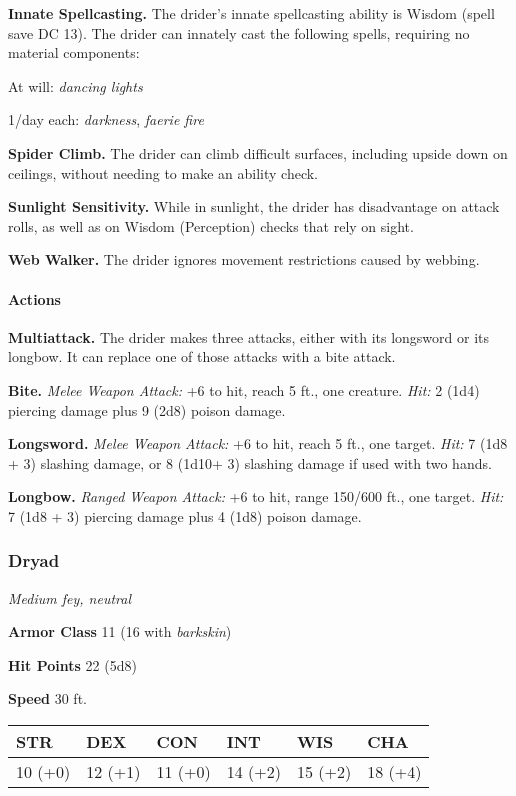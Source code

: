 \documentclass[
]{article}
\begin{document}
\textbf{Innate Spellcasting.} The drider's innate spellcasting ability
is Wisdom (spell save DC 13). The drider can innately cast the following
spells, requiring no material components:

At will: \emph{dancing lights}

1/day each: \emph{darkness}, \emph{faerie fire}

\textbf{Spider Climb.} The drider can climb difficult surfaces,
including upside down on ceilings, without needing to make an ability
check.

\textbf{Sunlight Sensitivity.} While in sunlight, the drider has
disadvantage on attack rolls, as well as on Wisdom (Perception) checks
that rely on sight.

\textbf{Web Walker.} The drider ignores movement restrictions caused by
webbing.

\hypertarget{actions-64}{%
\paragraph{Actions}\label{actions-64}}

\textbf{Multiattack.} The drider makes three attacks, either with its
longsword or its longbow. It can replace one of those attacks with a
bite attack.

\textbf{Bite.} \emph{Melee Weapon Attack:} +6 to hit, reach 5 ft., one
creature. \emph{Hit:} 2 (1d4) piercing damage plus 9 (2d8) poison
damage.

\textbf{Longsword.} \emph{Melee Weapon Attack:} +6 to hit, reach 5 ft.,
one target. \emph{Hit:} 7 (1d8 + 3) slashing damage, or 8 (1d10+ 3)
slashing damage if used with two hands.

\textbf{Longbow.} \emph{Ranged Weapon Attack:} +6 to hit, range 150/600
ft., one target. \emph{Hit:} 7 (1d8 + 3) piercing damage plus 4 (1d8)
poison damage.

\hypertarget{dryad}{%
\subsubsection{Dryad}\label{dryad}}

\emph{Medium fey, neutral}

\textbf{\textbf{Armor Class}} 11 (16 with \emph{barkskin})

\textbf{Hit Points} 22 (5d8)

\textbf{Speed} 30 ft.

\begin{longtable}[]{@{}llllll@{}}
\toprule
STR & DEX & CON & INT & WIS & CHA\tabularnewline
\midrule
\endhead
10 (+0) & 12 (+1) & 11 (+0) & 14 (+2) & 15 (+2) & 18 (+4)\tabularnewline
\bottomrule
\end{longtable}
\end{document}
